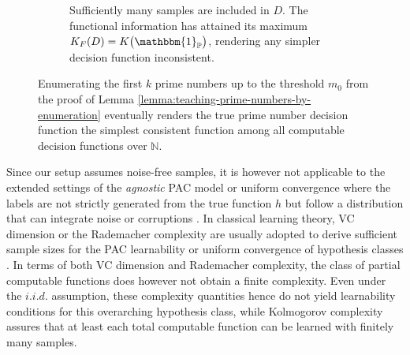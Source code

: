 \begin{figure}[h]
\begin{subfigure}{\textwidth}
\begin{tikzpicture}[every text node part/.style={align=center}, font=\footnotesize]
	\end{tikzpicture}
	\caption{Sufficiently many samples are included in $D$. The functional information has attained its maximum $K_F(D)=K\bigl(\mathbbm{1}_{\mathbb{P}}\bigr)$, rendering any simpler decision function inconsistent.}
	\label{fig:prime-number-elimination-by-enumeration-3}
	\end{subfigure}
	\caption[Enumerating the first $k$ prime numbers eventually renders the prime numbers the simplest consistent concept.]{Enumerating the first $k$ prime numbers up to the threshold $m_0$ from the proof of Lemma \ref{lemma:teaching-prime-numbers-by-enumeration} eventually renders the true prime number decision function the simplest consistent function among all computable decision functions over $\mathbb{N}$.}
	\label{fig:prime-number-elimination-by-enumeration}
\end{figure}

Since our setup assumes noise-free samples, it is however not applicable to the extended settings of the \textit{agnostic} PAC model or uniform convergence where the labels are not strictly generated from the true function $h$ but follow a distribution that can integrate noise or corruptions \cite[Chapter 4]{shalev2014understanding}.
In classical learning theory, VC dimension or the Rademacher complexity are usually adopted to derive sufficient sample sizes for the PAC learnability or uniform convergence of hypothesis classes \cite[Chapters 6,26]{shalev2014understanding}.
In terms of both VC dimension and Rademacher complexity, the class of partial computable functions does however not obtain a finite complexity.
Even under the $i.i.d.$ assumption, these complexity quantities hence do not yield learnability conditions for this overarching hypothesis class, while Kolmogorov complexity assures that at least each total computable function can be learned with finitely many samples.

